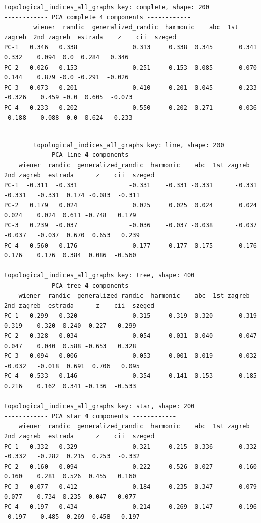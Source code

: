 \begin{landscape}
\begin{code}
\begin{verbatim}
topological_indices_all_graphs key: complete, shape: 200
------------ PCA complete 4 components ------------
        wiener  randic  generalized_randic  harmonic    abc  1st zagreb  2nd zagreb  estrada    z    cii  szeged
PC-1   0.346   0.338               0.313     0.338  0.345       0.341       0.332    0.094  0.0  0.284   0.346
PC-2  -0.026  -0.153               0.251    -0.153 -0.085       0.070       0.144    0.879 -0.0 -0.291  -0.026
PC-3  -0.073   0.201              -0.410     0.201  0.045      -0.233      -0.326    0.459 -0.0  0.605  -0.073
PC-4   0.233   0.202              -0.550     0.202  0.271       0.036      -0.188    0.088  0.0 -0.624   0.233
    

        \end{verbatim}
        \newpage
        \vspace*{\fill}

        \begin{verbatim}   
        topological_indices_all_graphs key: line, shape: 200
------------ PCA line 4 components ------------
    wiener  randic  generalized_randic  harmonic    abc  1st zagreb  2nd zagreb  estrada      z    cii  szeged
PC-1  -0.311  -0.331              -0.331    -0.331 -0.331      -0.331      -0.331   -0.331  0.174 -0.083  -0.311
PC-2   0.179   0.024               0.025     0.025  0.024       0.024       0.024    0.024  0.611 -0.748   0.179
PC-3   0.239  -0.037              -0.036    -0.037 -0.038      -0.037      -0.037   -0.037  0.670  0.653   0.239
PC-4  -0.560   0.176               0.177     0.177  0.175       0.176       0.176    0.176  0.384  0.086  -0.560

topological_indices_all_graphs key: tree, shape: 400
------------ PCA tree 4 components ------------
    wiener  randic  generalized_randic  harmonic    abc  1st zagreb  2nd zagreb  estrada      z    cii  szeged
PC-1   0.299   0.320               0.315     0.319  0.320       0.319       0.319    0.320 -0.240  0.227   0.299
PC-2   0.328   0.034               0.054     0.031  0.040       0.047       0.047    0.040  0.588 -0.653   0.328
PC-3   0.094  -0.006              -0.053    -0.001 -0.019      -0.032      -0.032   -0.018  0.691  0.706   0.095
PC-4  -0.533   0.146               0.354     0.141  0.153       0.185       0.216    0.162  0.341 -0.136  -0.533

topological_indices_all_graphs key: star, shape: 200
------------ PCA star 4 components ------------
    wiener  randic  generalized_randic  harmonic    abc  1st zagreb  2nd zagreb  estrada      z    cii  szeged
PC-1  -0.332  -0.329              -0.321    -0.215 -0.336      -0.332      -0.332   -0.282  0.215  0.253  -0.332
PC-2   0.160  -0.094               0.222    -0.526  0.027       0.160       0.160    0.281  0.526  0.455   0.160
PC-3   0.077   0.412              -0.184    -0.235  0.347       0.079       0.077   -0.734  0.235 -0.047   0.077
PC-4  -0.197   0.434              -0.214    -0.269  0.147      -0.196      -0.197    0.485  0.269 -0.458  -0.197


\end{verbatim}
\end{code}
\end{landscape}
